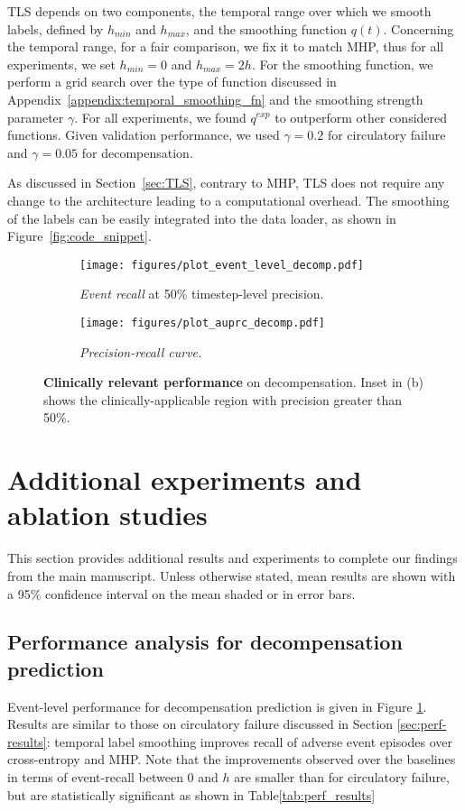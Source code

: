 \documentclass[nohyperref]{article}
\begin{document}
TLS depends on two components, the temporal range over which we smooth labels, defined by $h_{min}$ and $h_{max}$, and the smoothing function $q(t)$. Concerning the temporal range, for a fair comparison, we fix it to match MHP, thus for all experiments, we set $h_{min} = 0$ and $h_{max} = 2h$. For the smoothing function, we perform a grid search over the type of function discussed in Appendix~\ref{appendix:temporal_smoothing_fn} and the smoothing strength parameter $\gamma$. For all experiments, we found $q^{exp}$ to outperform other considered functions. Given validation performance, we used $\gamma = 0.2$ for {circulatory failure} and $\gamma = 0.05$ for {decompensation}.

As discussed in Section~\ref{sec:TLS}, contrary to MHP, TLS does not require any change to the architecture leading to a computational overhead. The smoothing of the labels can be easily integrated into the data loader, as shown in Figure~\ref{fig:code_snippet}. 

\begin{figure}[h]
\centering
\begin{subfigure}[b]{0.49\textwidth}
 \centering
  \texttt{[image: figures/plot\_event\_level\_decomp.pdf]}
  \caption{\textit{Event recall} at 50\% timestep-level precision.} \label{fig:event_decomp}
\end{subfigure}
\begin{subfigure}[b]{0.49\textwidth}
  \centering
  \texttt{[image: figures/plot\_auprc\_decomp.pdf]}
  \caption{\textit{Precision-recall curve.}}
  \label{fig:PR_curve_decomp}
\end{subfigure}
\caption{\textbf{Clinically relevant performance} on decompensation. Inset in (b) shows the clinically-applicable region with precision greater than 50\%.}
\label{fig:clinical_performance_decomp}
\end{figure}

\section{Additional experiments and ablation studies}
\label{appendix:add_exp}

This section provides additional results and experiments to complete our findings from the main manuscript. Unless otherwise stated, mean results are shown with a 95\% confidence interval on the mean shaded or in error bars.

\subsection{Performance analysis for decompensation prediction}
\label{appendix:decomp_results}
Event-level performance for decompensation prediction is given in Figure \ref{fig:event_decomp}. Results are similar to those on circulatory failure discussed in Section \ref{sec:perf-results}: temporal label smoothing improves recall of adverse event episodes over cross-entropy and MHP. Note that the improvements observed over the baselines in terms of event-recall between 0 and $h$ are smaller than for circulatory failure, but are statistically significant as shown in Table\ref{tab:perf_results}
\end{document}
